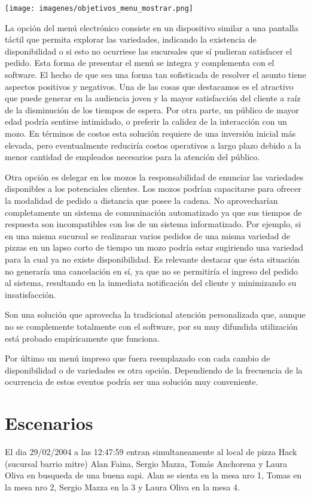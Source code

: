 \documentclass[a4paper,10pt]{article}
\begin{document}
\texttt{[image: imagenes/objetivos\_menu\_mostrar.png]}

La opción del menú electrónico consiste en un dispositivo similar a una pantalla táctil que permita explorar las variedades, indicando la existencia de disponibilidad o si esto no ocurriese las sucursales que sí pudieran satisfacer el pedido. Esta forma de presentar el menú se integra y complementa con el software. El hecho de que sea una forma tan sofisticada de resolver el asunto tiene aspectos positivos y negativos. Una de las cosas que destacamos es el atractivo que puede generar en la audiencia joven y la mayor satisfacción del cliente a raíz de la disminución de los tiempos de espera. 
Por otra parte, un público de mayor edad podría sentirse intimidado, o preferir la calidez de la interacción con un mozo. En términos de costos esta solución requiere de una inversión inicial más elevada, pero eventualmente reduciría costos operativos a largo plazo debido a la menor cantidad de empleados necesarios para la atención del público. 

Otra opción es delegar en los mozos la responsabilidad de enunciar las variedades disponibles a los potenciales clientes.
Los mozos podrían capacitarse para ofrecer la modalidad de pedido a distancia que posee la cadena. No aprovecharían completamente un sistema de comuninación automatizado ya que sus tiempos de respuesta son incompatibles con los de un sistema informatizado. Por ejemplo, si en una misma sucursal se realizaran varios pedidos de una misma variedad de pizzas en un lapso corto de tiempo un mozo podría estar sugiriendo una variedad para la cual ya no existe disponibilidad. Es relevante destacar que ésta situación no generaría una cancelación en sí, ya que no se permitiría el ingreso del pedido al sistema, resultando en la inmediata notificación del cliente y minimizando su insatisfacción.

Son una solución que aprovecha la tradicional atención personalizada que, aunque no se complemente totalmente con el software, por su muy difundida utilización está probado empíricamente que funciona.

Por último un menú impreso que fuera reemplazado con cada cambio de disponibilidad o de variedades es otra opción. Dependiendo de la frecuencia de la ocurrencia de estos eventos podría ser una solución muy conveniente. 

\newpage
\section*{Escenarios}
El dia 29/02/2004 a las 12:47:59 entran simultaneamente al local de pizza Hack (sucursal barrio mitre) Alan Faina, 
Sergio Mazza, Tom\'as Anchorena y Laura Oliva en busqueda de una buena sapi. 
Alan se sienta en la mesa nro 1, Tomas en la mesa nro 2, Sergio Mazza en la 3 y Laura Oliva en la mesa 4. 
\end{document}
